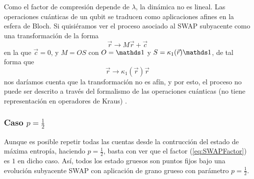 Como el factor de compresión depende de $\lambda$, la dinámica no es lineal. Las operaciones cuánticas de un qubit se traducen como aplicaciones afines en la esfera de Bloch. Si quisiéramos ver el proceso asociado al \textsc{SWAP} subyacente como una transformación de la forma
\begin{equation*}
  \vec{r}\rightarrow M\vec{r}+\vec{c}
\end{equation*}
en la que $\vec{c}=0$, y $M=OS$ con $O=\Id$ y $S=\kappa_{1}(\vec{r})\Id$, de tal forma que
\begin{equation*}
  \vec{r}\rightarrow \kappa_{1}(\vec{r})\vec{r}
\end{equation*}
nos daríamos cuenta que la transformación no es afín, y por esto, el proceso no puede ser descrito a través del formalismo de las operaciones cuánticas (no tiene representación en operadores de Kraus) \cite{Chuang}.
\subsubsection{Caso $p=\frac{1}{2}$}

Aunque es posible repetir todas las cuentas desde la contrucción del estado de máxima entropía, haciendo $p=\frac{1}{2}$, basta con ver que el factor (\eqref{eq:SWAPFactor}) es $1$ en dicho caso. Así, todos los estado gruesos son puntos fijos bajo una evolución subyacente SWAP con aplicación de grano grueso con parámetro $p=\frac{1}{2}$.

